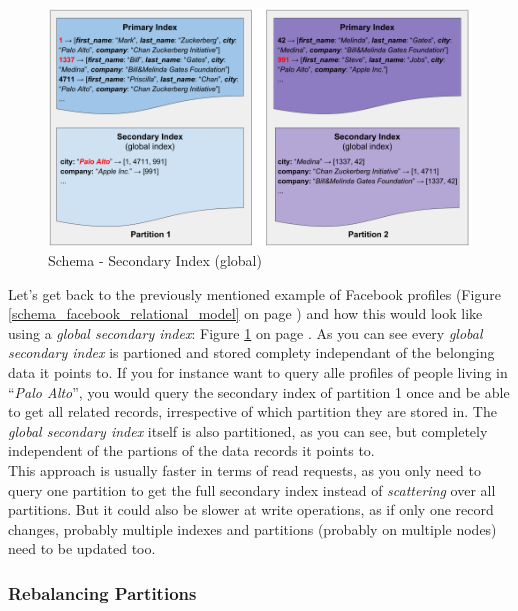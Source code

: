 {\begin{figure}[h]
	\centering
  \includegraphics[width=1\textwidth]{partitioning_secondary_indexes_global.png}
	\caption{Schema - Secondary Index (global)}
	\label{partitioning_secondary_indexes_global}
\end{figure}

Let's get back to the previously mentioned example of Facebook profiles (Figure \ref{schema_facebook_relational_model} on page \pageref{schema_facebook_relational_model}) and how this would look like using a \textit{global secondary index}: Figure \ref{partitioning_secondary_indexes_global} on page \pageref{partitioning_secondary_indexes_global}.
As you can see every \textit{global secondary index} is partioned and stored complety independant of the belonging data it points to. If you for instance want to query alle profiles of people living in ``\textit{Palo Alto}'', you would query the secondary index of partition 1 once and be able to get all related records, irrespective of which partition they are stored in. The \textit{global secondary index} itself is also partitioned, as you can see, but completely independent of the partions of the data records it points to. \\
This approach is usually faster in terms of read requests, as you only need to query one partition to get the full secondary index instead of \textit{scattering} over all partitions. But it could also be slower at write operations, as if only one record changes, probably multiple indexes and partitions (probably on multiple nodes) need to be updated too.
\newpage

\subsubsection{Rebalancing Partitions}
\label{tf_dds_partitioning_rebalancing}

}
